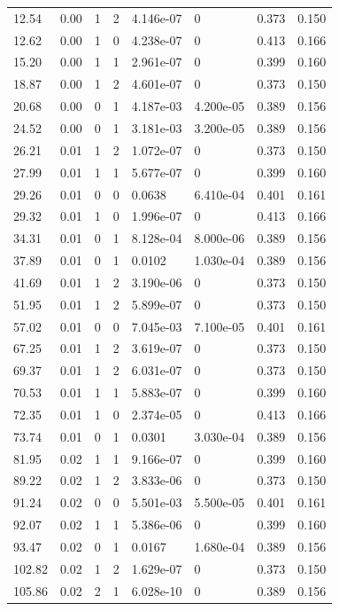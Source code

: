 \documentclass[preview]{standalone}
\begin{document}
{{\begin{tabular}{L{1.2cm}C{1.2cm} C{0.3cm}C{0.5cm} C{1.4cm}C{1.4cm} C{1.4cm}C{1.4cm}}
  12.54  &  0.00  & 1     &  2 &  4.146e-07  & 0  & 0.373 &  0.150   \\ 
  12.62  &  0.00  & 1     &  0 &  4.238e-07  & 0  & 0.413 &  0.166   \\ 
  15.20  &  0.00  & 1     &  1 &  2.961e-07  & 0  & 0.399 &  0.160   \\ 
  18.87  &  0.00  & 1     &  2 &  4.601e-07  & 0  & 0.373 &  0.150   \\ 
  20.68  &  0.00  & 0     &  1 &  4.187e-03  & 4.200e-05  & 0.389 &  0.156   \\ 
  24.52  &  0.00  & 0     &  1 &  3.181e-03  & 3.200e-05  & 0.389 &  0.156   \\ 
  26.21  &  0.01  & 1     &  2 &  1.072e-07  & 0  & 0.373 &  0.150   \\ 
  27.99  &  0.01  & 1     &  1 &  5.677e-07  & 0  & 0.399 &  0.160   \\ 
  29.26  &  0.01  & 0     &  0 &  0.0638  & 6.410e-04  & 0.401 &  0.161   \\ 
  29.32  &  0.01  & 1     &  0 &  1.996e-07  & 0  & 0.413 &  0.166   \\ 
  34.31  &  0.01  & 0     &  1 &  8.128e-04  & 8.000e-06  & 0.389 &  0.156   \\ 
  37.89  &  0.01  & 0     &  1 &  0.0102  & 1.030e-04  & 0.389 &  0.156   \\ 
  41.69  &  0.01  & 1     &  2 &  3.190e-06  & 0  & 0.373 &  0.150   \\ 
  51.95  &  0.01  & 1     &  2 &  5.899e-07  & 0  & 0.373 &  0.150   \\ 
  57.02  &  0.01  & 0     &  0 &  7.045e-03  & 7.100e-05  & 0.401 &  0.161   \\ 
  67.25  &  0.01  & 1     &  2 &  3.619e-07  & 0  & 0.373 &  0.150   \\ 
  69.37  &  0.01  & 1     &  2 &  6.031e-07  & 0  & 0.373 &  0.150   \\ 
  70.53  &  0.01  & 1     &  1 &  5.883e-07  & 0  & 0.399 &  0.160   \\ 
  72.35  &  0.01  & 1     &  0 &  2.374e-05  & 0  & 0.413 &  0.166   \\ 
  73.74  &  0.01  & 0     &  1 &  0.0301  & 3.030e-04  & 0.389 &  0.156   \\ 
  81.95  &  0.02  & 1     &  1 &  9.166e-07  & 0  & 0.399 &  0.160   \\ 
  89.22  &  0.02  & 1     &  2 &  3.833e-06  & 0  & 0.373 &  0.150   \\ 
  91.24  &  0.02  & 0     &  0 &  5.501e-03  & 5.500e-05  & 0.401 &  0.161   \\ 
  92.07  &  0.02  & 1     &  1 &  5.386e-06  & 0  & 0.399 &  0.160   \\ 
  93.47  &  0.02  & 0     &  1 &  0.0167  & 1.680e-04  & 0.389 &  0.156   \\ 
  102.82  &  0.02  & 1     &  2 &  1.629e-07  & 0  & 0.373 &  0.150   \\ 
  105.86  &  0.02  & 2     &  1 &  6.028e-10  & 0  & 0.389 &  0.156   \\ 
\hline 
\end{tabular} 

}}
\end{document}
